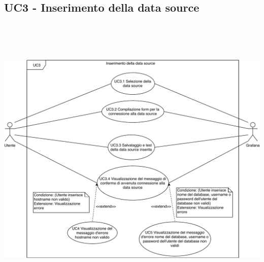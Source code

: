 \subsection{UC3 - Inserimento della data source}
\hspace*{-1.5cm}\includegraphics[width=500pt, height=400pt]{img/uc3.pdf}

